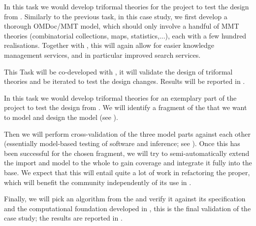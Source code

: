 \begin{workpackage}[id=dksbases,%
  title=Data/Knowledge/Software-Bases,lead=JU,
  ZHRM=12,JURM=36,UWRM=25,SARM=10,LLRM=2,PSRM=4]
\begin{tasklist}

\begin{task}[title=FindStat Case Study (triformal theories),id=data-findstat,
  lead=JU,partners={ZH},PM=9,wphases=18-30!.5]
  In this task we would develop triformal theories for the \FindStat project to test the
  design from .  Similarly to the previous task, in this
  case study, we first develop a thorough OMDoc/MMT model, which should only involve a
  handful of MMT theories (combinatorial collections, maps, statistics,...), each with a
  few hundred realisations. Together with   , this will again allow for
  easier knowledge management services, and in particular improved search services.

  This Task will be co-developed with , it will validate
  the design of triformal theories and be iterated to test the design changes. Results
  will be reported in .
\end{task}

\begin{task}[title=\LMFDB Case study (triformal theories),id=data-LMFDB,
  lead=JU,partners={ZH,UW},PM=24,wphases={12-24!.25,24-48!.7}]
  In this task we would develop triformal theories for an exemplary part of the \LMFDB
  project to test the design from .  We will identify a
  fragment of the \LMFDB that we want to model and design the model (see
  ). 

  Then we will perform cross-validation of the three model parts against each other
  (essentially model-based testing of software and inference; see
  ). Once this has been successful for the chosen fragment, we
  will try to semi-automatically extend the import and model to the whole \LMFDB to gain
  coverage and integrate it fully into the \DKS base. We expect that this will entail
  quite a lot of work in refactoring the \LMFDB proper, which will benefit the \LMFDB
  community independently of its use in \TheProject.

  Finally, we will pick an algorithm from the \LMFDB and verify it against its
  specification and the computational foundation developed in
  , this is the final validation of the case study; the
  results are reported in .
  \end{task}


\end{tasklist}
\end{workpackage}
